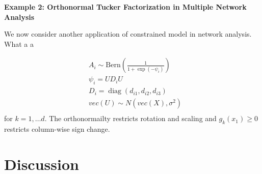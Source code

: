 \documentclass[10pt]{article}
\newcommand{\mc}[1]{\mathcal{#1}}
\DeclareMathOperator{\No}{No}
\DeclareMathOperator{\diag}{diag}
\DeclareMathOperator{\1}{\mathbbm{1}}
\begin{document}
%
%
%

{\bf Example 2: Orthonormal Tucker Factorization in Multiple Network Analysis}

We now consider another application of constrained model in network analysis. What a a


 \begin{equation*}
\begin{aligned}
& A_i \sim \text{Bern}( \frac{1}{1+ \exp(- \psi_i)})\\
& \psi_i = UD_iU \\
& D_i = \diag(d_{i1},d_{i2},d_{i3}) \\
& vec(U) \sim N (vec (X), \sigma^2)\\
\end{aligned}
\end{equation*}
for $k=1,\ldots d$. The orthonormailty restricts rotation and scaling and $g_k(x_1)\ge 0$ restricts column-wise sign change. 



\section{Discussion}





\end{document}
